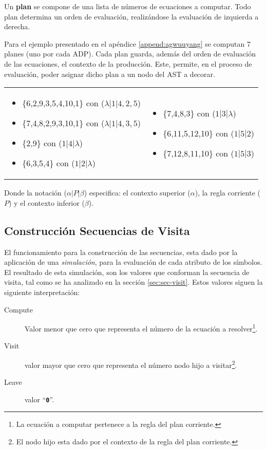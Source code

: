 \documentclass[runningheads,a4paper]{llncs}
\newcommand{\textbtt}[1]{\texttt{\textbf{#1}}}
\begin{document}
Un \textbf{plan} se compone de una lista de números de ecuaciones a computar. Todo plan determina un orden de evaluación, realizándose la evaluación de izquierda a derecha.


Para el ejemplo presentado en el apéndice \ref{append:agwuuyang} se computan 7 planes (uno por cada ADP). Cada plan guarda, además del orden de evaluación de las ecuaciones, el contexto de la producción. Este, permite, en el proceso de evaluación, poder asignar dicho plan a un nodo del AST a decorar.

\begin{tabular}{p{6cm}p{6cm}}
\begin{itemize}
\item \{6,2,9,3,5,4,10,1\} con ($\lambda| 1 | 4,2,5$)
\item \{7,4,8,2,9,3,10,1\} con ($\lambda| 1 | 4,3,5$)
\item \{2,9\} con  ($1 | 4 | \lambda$)
\item \{6,3,5,4\} con  ($ 1 | 2 | \lambda$)
\end{itemize}&
\begin{itemize}
\item \{7,4,8,3\} con  ($ 1 | 3 | \lambda$)
\item \{6,11,5,12,10\} con  ($ 1 | 5 | 2$)
\item \{7,12,8,11,10\} con  ($ 1 | 5 | 3$)
\end{itemize}\\
\end{tabular}

Donde la notación ($\alpha | P | \beta$) especifica: el contexto superior ($\alpha$), la regla corriente ($P$) y el contexto inferior ($\beta$).

\subsection{Construcción Secuencias de Visita}
\label{seubsec:seq-visit}
El funcionamiento para la construcción de las secuencias, esta dado por la aplicación de una \textit{simulación}, para la evaluación de cada atributo de los símbolos. El resultado de esta simulación, son los valores que conforman la secuencia de visita, tal como se ha analizado en la sección \ref{sec:sec-visit}. Estos valores siguen la siguiente interpretación: 

\begin{description}
\item [Compute] Valor menor que cero que representa el número de la ecuación a resolver\footnote{La ecuación a computar pertenece a la regla del plan corriente.}.
\item [Visit] valor mayor que cero que representa el número nodo hijo a visitar\footnote{El nodo hijo esta dado por el contexto de la regla del plan corriente.}.
\item [Leave] valor ``\textbtt{0}''.
\end{description}
\end{document}
